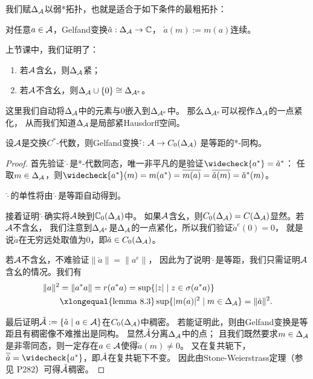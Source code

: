 我们赋$\Delta_{\mathcal{A}}$以弱*拓扑，也就是适合于如下条件的最粗拓扑：
\begin{center}
    对任意$a \in \mathcal{A}$，Gelfand变换$\check{a}:\Delta_{\mathcal{A}} \to \mathbb{C}$，
    $\check{a}(m) := m(a)$连续。
\end{center}

上节课中，我们证明了：
\begin{proposition}
    \begin{enumerate}
        \item 若$\mathcal{A}$含幺，则$\Delta_{\mathcal{A}}$紧；
        \item 若$\mathcal{A}$不含幺，则$\Delta_{\mathcal{A}} \cup \{0\} \cong \Delta_{\mathcal{A}^e}$。
    \end{enumerate}
\end{proposition}
这里我们自动将$\Delta_{\mathcal{A}}$中的元素与$0$嵌入到$\Delta_{\mathcal{A}^e}$中。
那么$\Delta_{\mathcal{A}^e}$可以视作$\Delta_{\mathcal{A}}$的一点紧化，
从而我们知道$\Delta_{\mathcal{A}}$是局部紧Hausdorff空间。

\begin{theorem}
    设$\mathcal{A}$是交换$C^*$-代数，则Gelfand变换$\check{\cdot} \colon \mathcal{A} \to C_0(\Delta_{\mathcal{A}})$
    是等距的*-同构。
\end{theorem}
\begin{proof}
    首先验证$\check\cdot$是*-代数同态，唯一非平凡的是验证$\widecheck{a^*} = \check{a}^*$：
    任取$m \in \Delta_{\mathcal{A}}$，则$\widecheck{a^*}(m) = m(a^*) = \overline{m(a)} = \overline{\check{a}(m)} = \check{a}^*(m)$。

    $\check\cdot$的单性将由$\check\cdot$是等距自动得到。

    接着证明$\check\cdot$确实将$\mathcal{A}$映到$\mathbb{C}_0(\Delta_{\mathcal{A}})$中。
    如果$\mathcal{A}$含幺，则$C_0(\Delta_{\mathcal{A}}) = C(\Delta_{\mathcal{A}})$显然。若$\mathcal{A}$不含幺，
    我们注意到$\Delta_{\mathcal{A}^e}$是$\Delta_{\mathcal{A}}$的一点紧化，所以我们验证$\check{a}^e(0) = 0$，
    就是说$\check{a}$在无穷远处取值为$0$，即$\check{a} \in C_0(\Delta_{\mathcal{A}})$。
    
    若$\mathcal{A}$不含幺，不难验证$\|\check{a}\| = \|a^e\|$，
    因此为了说明$\check\cdot$是等距，我们只需证明$\mathcal{A}$含幺的情况。我们有
    \begin{align*}
    \|a\|^2 & = \|a^*a\| = r(a^*a) = \sup\{|z| \mid z \in \sigma(a^*a)\} \\ 
    & \xlongequal{\text{lemma 8.3}} \sup\{|m(a)|^2 \mid m \in \Delta_\cA\} = \|\check{a}\|^2.
    \end{align*}

    最后证明$\check{\mathcal{A}} := \{\check{a} \mid a \in \mathcal{A}\}$在$C_0(\Delta_{\mathcal{A}})$中稠密。
    若能证明此，则由Gelfand变换是等距且有稠密像不难推出是同构。
    显然$\check{\mathcal{A}}$分离$\Delta_{\mathcal{A}}$中的点；
    且我们既然要求$m \in \Delta_{\mathcal{A}}$是非零同态，则一定存在$a \in \mathcal{A}$使得$\check{a}(m) \neq 0$。
    又在复共轭下，$\overline{\check{a}} = \widecheck{a^*}$，即$\check{\mathcal{A}}$在复共轭下不变。
    因此由Stone-Weierstrass定理（参见\cite{Pr} P282）可得$\check{\mathcal{A}}$稠密。
\end{proof}

